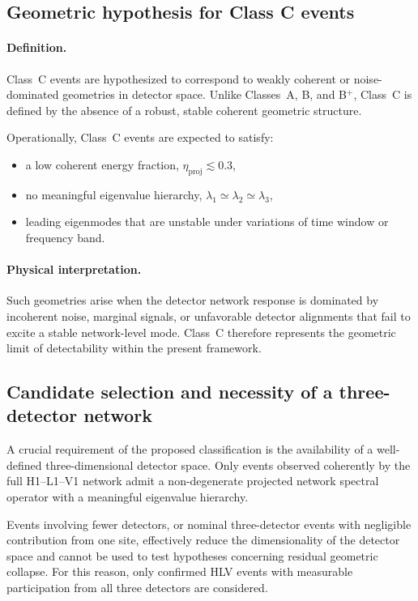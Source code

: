 \documentclass[11pt,a4paper]{article}
\begin{document}
\subsection{Geometric hypothesis for Class C events}

\paragraph{Definition.}
Class~C events are hypothesized to correspond to weakly coherent or noise-dominated
geometries in detector space.
Unlike Classes~A, B, and B$^+$, Class~C is defined by the absence of a robust, stable
coherent geometric structure.

Operationally, Class~C events are expected to satisfy:
\begin{itemize}
\item a low coherent energy fraction,
      $\eta_{\mathrm{proj}} \lesssim 0.3$,
\item no meaningful eigenvalue hierarchy,
      $\lambda_1 \simeq \lambda_2 \simeq \lambda_3$,
\item leading eigenmodes that are unstable under variations of time window or frequency
      band.
\end{itemize}

\paragraph{Physical interpretation.}
Such geometries arise when the detector network response is dominated by incoherent noise,
marginal signals, or unfavorable detector alignments that fail to excite a stable
network-level mode.
Class~C therefore represents the geometric limit of detectability within the present
framework.

\subsection{Candidate selection and necessity of a three-detector network}

A crucial requirement of the proposed classification is the availability of a
well-defined three-dimensional detector space.
Only events observed coherently by the full H1--L1--V1 network admit a non-degenerate
projected network spectral operator with a meaningful eigenvalue hierarchy.

Events involving fewer detectors, or nominal three-detector events with negligible
contribution from one site, effectively reduce the dimensionality of the detector space
and cannot be used to test hypotheses concerning residual geometric collapse.
For this reason, only confirmed HLV events with measurable participation from all three
detectors are considered.
\end{document}
